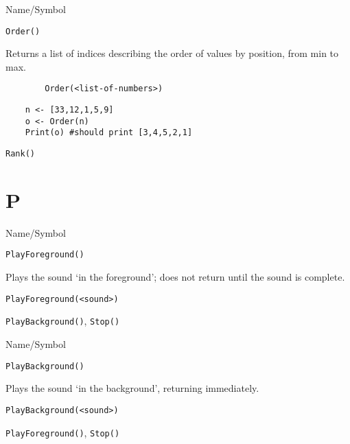\rl






\begin{desc}{Name/Symbol}
\item[Name/Symbol]	\verb+Order()+

\item[Description]	Returns a list of indices describing the order of values by position, from min to max. 

\item[Usage]
\begin{verbatim}
		Order(<list-of-numbers>)
\end{verbatim}

\item[Example]	
\begin{verbatim}
	n <- [33,12,1,5,9]
  	o <- Order(n)
    Print(o) #should print [3,4,5,2,1]
\end{verbatim}

\item[See Also]	\verb+Rank()+
\end{desc}

\rl
\section{P}
\rl


\begin{desc}{Name/Symbol}
\item[Name/Symbol]	\verb+PlayForeground()+  

\item[Description]	Plays the sound `in the foreground'; 
		does not return until the sound is complete.

\item[Usage]		
\begin{verbatim}
PlayForeground(<sound>)
\end{verbatim}

\item[Example]	

\item[See Also]	\verb+PlayBackground()+, \verb+Stop()+
\end{desc}

\rl


\begin{desc}{Name/Symbol}
\item[Name/Symbol]	\verb+PlayBackground()+
 
\item[Description]	Plays the sound `in the background', returning immediately.

\item[Usage]		
\begin{verbatim}
PlayBackground(<sound>)
\end{verbatim}

\item[Example]	

\item[See Also]	\verb+PlayForeground()+, \verb+Stop()+
\end{desc}

